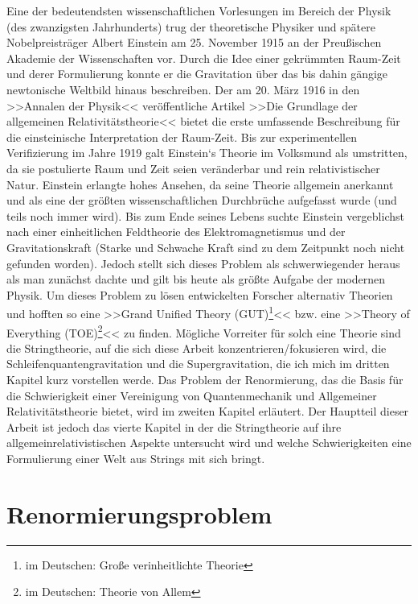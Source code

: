 \documentclass[a4paper,11pt]{article}
\begin{document}
Eine der bedeutendsten wissenschaftlichen Vorlesungen im Bereich der Physik (des zwanzigsten Jahrhunderts) trug der theoretische Physiker und spätere Nobelpreisträger Albert Einstein am 25. November 1915 an der Preußischen Akademie der Wissenschaften vor. Durch die Idee einer gekrümmten Raum-Zeit und derer Formulierung konnte er die Gravitation über das bis dahin gängige newtonische Weltbild hinaus beschreiben. Der am 20. März 1916 in den >>Annalen der Physik<< veröffentliche Artikel >>Die Grundlage der allgemeinen Relativitätstheorie<<  bietet die erste umfassende Beschreibung für die einsteinische Interpretation der Raum-Zeit. Bis zur experimentellen Verifizierung im Jahre 1919 galt Einstein`s Theorie im Volksmund als umstritten, da sie postulierte Raum und Zeit seien veränderbar und rein relativistischer Natur. Einstein erlangte hohes Ansehen, da seine Theorie allgemein anerkannt und als eine der größten wissenschaftlichen Durchbrüche aufgefasst wurde (und teils noch immer wird). Bis zum Ende seines Lebens suchte Einstein vergeblichst nach einer einheitlichen Feldtheorie des Elektromagnetismus und der Gravitationskraft (Starke und Schwache Kraft sind zu dem Zeitpunkt noch nicht gefunden worden). Jedoch stellt sich dieses Problem als schwerwiegender heraus als man zunächst dachte und gilt bis heute als größte Aufgabe der modernen Physik. Um dieses Problem zu lösen entwickelten Forscher alternativ Theorien und hofften so eine >>Grand Unified Theory (GUT)\footnote{im Deutschen: Große verinheitlichte Theorie}<< bzw. eine >>Theory of Everything (TOE)\footnote{im Deutschen: Theorie von Allem}<< zu finden. Mögliche Vorreiter für solch eine Theorie sind die Stringtheorie, auf die sich diese Arbeit konzentrieren/fokusieren wird, die Schleifenquantengravitation und die Supergravitation, die ich mich im dritten Kapitel kurz vorstellen werde.
Das Problem der Renormierung, das die Basis für die Schwierigkeit einer Vereinigung von Quantenmechanik und Allgemeiner Relativitätstheorie bietet, wird im zweiten Kapitel erläutert. Der Hauptteil dieser Arbeit ist jedoch das vierte Kapitel in der die Stringtheorie auf ihre allgemeinrelativistischen Aspekte untersucht wird und welche Schwierigkeiten eine Formulierung einer Welt aus Strings mit sich bringt. 

\newpage
\section{Renormierungsproblem}
\end{document}
